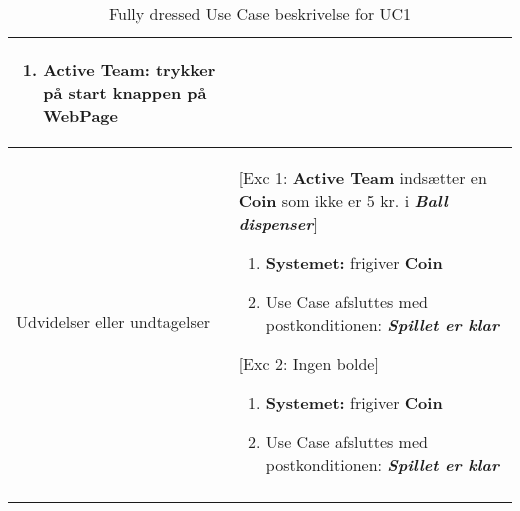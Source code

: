 \documentclass[Kravspecifikation/Kravspec_Main.tex]{subfiles}
\begin{document}
\begin{longtable}[]{@{}ll@{}}
\begin{minipage}[t]{0.47\columnwidth}
\begin{enumerate}
\item
  {\textbf{Active Team:} trykker på start knappen på WebPage}
\end{enumerate}\strut
\end{minipage}\tabularnewline
\toprule
\begin{minipage}[t]{0.47\columnwidth}\raggedright
{Udvidelser eller undtagelser}\strut
\end{minipage} & \begin{minipage}[t]{0.47\columnwidth}\raggedright
{[Exc 1: \textbf{Active Team} indsætter en \textbf{Coin} som ikke er 5 kr. i \textit{\textbf{Ball dispenser}}]}
\begin{enumerate}
\tightlist
\item \textbf{Systemet:} frigiver \textbf{Coin}
\item Use Case afsluttes med postkonditionen:  \textbf{\textit{Spillet er klar}}
\end{enumerate}
{[Exc 2: Ingen bolde]}
\begin{enumerate}
\tightlist
\item \textbf{Systemet:} frigiver \textbf{Coin}
\item Use Case afsluttes med postkonditionen:  \textbf{\textit{Spillet er klar}}
\end{enumerate}
{}\strut
\end{minipage}\tabularnewline
\bottomrule
\bottomrule
\caption{Fully dressed Use Case beskrivelse for UC1}
\label{tab:UC1}
\end{longtable}
\end{document}
